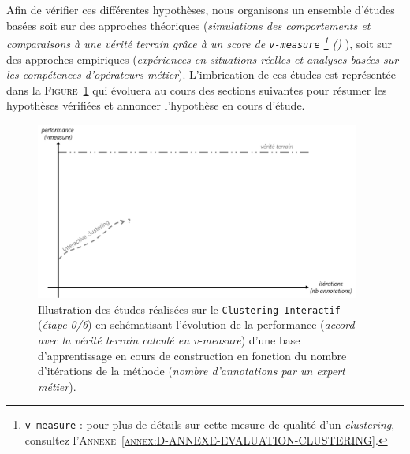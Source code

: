 	Afin de vérifier ces différentes hypothèses, nous organisons un ensemble d'études basées soit sur des approches théoriques (\textit{simulations des comportements et comparaisons à une vérité terrain grâce à un score de \texttt{v-measure} \footnote{
		\texttt{v-measure} : pour plus de détails sur cette mesure de qualité d'un \textit{clustering}, consultez l'\textsc{Annexe~\ref{annex:D-ANNEXE-EVALUATION-CLUSTERING}}.
	} (\cite{rosenberg-hirschberg:2007:vmeasure-conditional-entropybased}) } ), soit sur des approches empiriques (\textit{expériences en situations réelles et analyses basées sur les compétences d'opérateurs métier}).
	L'imbrication de ces études est représentée dans la \textsc{Figure~\ref{figure:4.0-HYPOTHESE-00-DEFAULT}} qui évoluera au cours des sections suivantes pour résumer les hypothèses vérifiées et annoncer l'hypothèse en cours d'étude.
	\begin{figure}[!htb]
		\centering
		\includegraphics[width=0.95\textwidth]{figures/hypotheses-00-default}
		\caption{
			Illustration des études réalisées sur le \texttt{Clustering Interactif} (\textit{étape 0/6}) en schématisant l'évolution de la performance (\textit{accord avec la vérité terrain calculé en v-measure}) d'une base d'apprentissage en cours de construction en fonction du nombre d'itérations de la méthode (\textit{nombre d'annotations par un expert métier}).
		}
		\label{figure:4.0-HYPOTHESE-00-DEFAULT}
	\end{figure}
		
